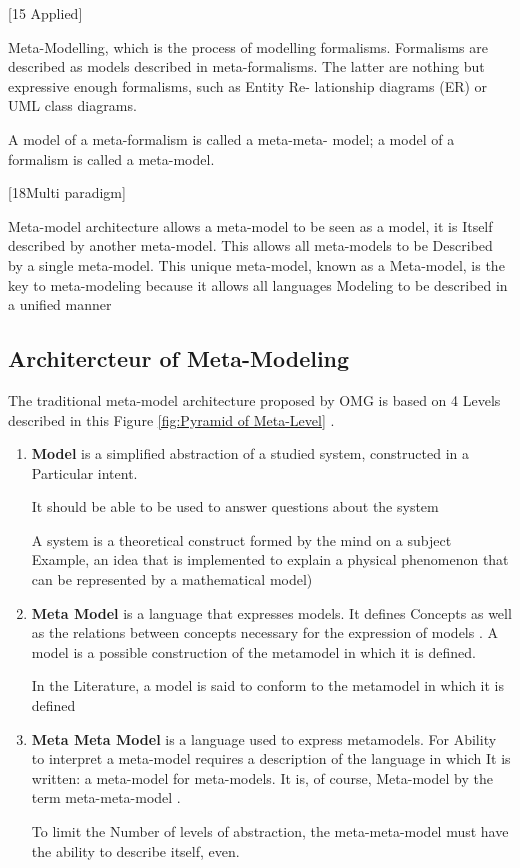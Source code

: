 \cite{ch3-applied} [15 Applied]



Meta-Modelling, which is the process of modelling formalisms. 
Formalisms are described as models described in meta-formalisms. 
The latter are nothing  but expressive enough formalisms, such as Entity Re-
lationship diagrams (ER) or UML class diagrams.

A model of a meta-formalism is called a meta-meta-
model; a model of a formalism is called a meta-model.
 
\cite{ch3-meta2}[18Multi paradigm]

Meta-model architecture allows a meta-model to be seen as a model, it is
Itself described by another meta-model. This allows all meta-models to be
Described by a single meta-model. This unique meta-model, known as a
Meta-model, is the key to meta-modeling because it allows all languages
Modeling to be described in a unified manner


\subsection{Architercteur of Meta-Modeling}
The traditional meta-model architecture proposed by OMG is based on 4 Levels
described in this Figure \ref{fig:Pyramid of Meta-Level} .
\cite{ch3-doc} \cite{ch3-mml} 
\begin{enumerate}
\item \textbf{Model} is a simplified abstraction of a studied system, constructed in a
Particular intent. 

It should be able to be used to answer questions about the system

A system is a theoretical construct formed by the mind on a subject
Example, an idea that is implemented to explain a physical phenomenon that can
be represented by a mathematical model) 

\item \textbf{Meta Model} is a language that expresses models. It defines
Concepts as well as the relations between concepts necessary for the expression of models . 
A model is a possible construction of the metamodel in which it is defined.

In the Literature, a model is said to conform to the metamodel in which it is defined

\item \textbf{Meta Meta Model} is a language used to express metamodels. 
For Ability to interpret a meta-model requires a description of the language in which
It is written: a meta-model for meta-models. 
It is, of course, Meta-model by the term meta-meta-model  . 

To limit the  Number of levels of abstraction, the meta-meta-model 
must have the ability to describe itself, even. 
 

\end{enumerate}

